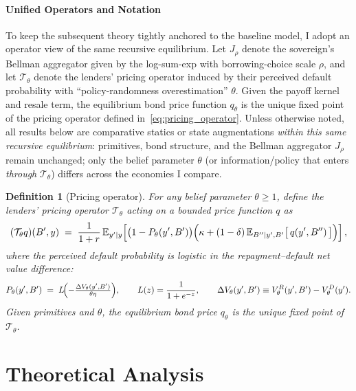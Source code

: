\documentclass[12pt]{article}
\theoremstyle{plain}
\newtheorem{definition}{Definition}
\newcommand{\E}{\mathbb{E}}
\begin{document}
\paragraph{Unified Operators and Notation}
To keep the subsequent theory tightly anchored to the baseline model, I adopt
an operator view of the same recursive equilibrium. Let $J_\rho$ denote the
sovereign's Bellman aggregator given by the log-sum-exp with borrowing-choice
scale $\rho$, and let $\mathcal T_\theta$ denote the lenders' pricing operator
induced by their perceived default probability with ``policy-randomness
overestimation'' $\theta$. Given the payoff kernel and resale term, the
equilibrium bond price function $q_\theta$ is the unique fixed point of the
pricing operator defined in~\eqref{eq:pricing_operator}. Unless otherwise
noted, all results below are comparative statics or state augmentations
\emph{within this same recursive equilibrium}: primitives, bond structure, and
the Bellman aggregator $J_\rho$ remain unchanged; only the belief parameter
$\theta$ (or information/policy that enters \emph{through} $\mathcal T_\theta$)
differs across the economies I compare.

\begin{definition}[Pricing operator]
	\label{def:pricing_operator}
	For any belief parameter $\theta \ge 1$, define the lenders' pricing operator $\mathcal T_\theta$ acting on a bounded price function $q$ as
	\begin{equation}
		(\mathcal T_\theta q)(B',y)
		\;=\; \frac{1}{1+r}\,\E_{y'|y}\!\left[\bigl(1-P_\theta(y',B')\bigr)\Bigl(\kappa+(1-\delta)\,\E_{B''|y',B'}\big[\,q(y',B'')\,\big]\Bigr)\right],
		\label{eq:pricing_operator}
	\end{equation}
	where the perceived default probability is logistic in the repayment--default net value difference:
	\begin{equation}
		P_\theta(y',B') \;=\; L\!\Bigl(-\tfrac{\Delta V_\theta(y',B')}{\theta\eta}\Bigr),\qquad
		L(z)=\frac{1}{1+e^{-z}},\qquad
		\Delta V_\theta(y',B')\equiv V_\theta^R(y',B')-V_\theta^D(y').
		\label{eq:net_value_definition}
	\end{equation}
	Given primitives and $\theta$, the equilibrium bond price $q_\theta$ is the unique fixed point of $\mathcal T_\theta$.
\end{definition}

\section{Theoretical Analysis}
\label{sec:theory}
\end{document}
